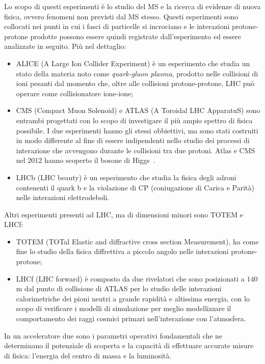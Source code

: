 Lo scopo di questi esperimenti è lo studio del MS e la ricerca di evidenze di nuova fisica, ovvero fenomeni non previsti dal MS stesso. Questi esperimenti sono collocati nei punti in cui i fasci di particelle si incrociano e le interazioni protone-protone prodotte possono essere quindi registrate dall'esperimento ed essere analizzate in seguito. Pi\`u nel dettaglio:
\begin{itemize}
\item ALICE (A Large Ion Collider Experiment) \`e un esperimento che studia un stato della materia noto come {\em quark-gluon plasma}, prodotto nelle collisioni di ioni pesanti dal momento che, oltre alle collisioni protone-protone, LHC pu\`o operare come collisionatore ione-ione;
\item CMS (Compact Muon Solenoid) e ATLAS (A Toroidal LHC ApparatuS) sono entrambi progettati con lo scopo di investigare il più ampio spettro di fisica possibile. I due esperimenti hanno gli stessi obbiettivi, ma sono stati costruiti in modo differente al fine di essere indipendenti nello studio dei processi di interazione che avvengono durante le collisioni tra due protoni. Atlas e CMS nel 2012 hanno scoperto il bosone di Higgs~\cite{scopertahiggs}. 
\item LHCb (LHC beauty) \`e un esperimento che studia la fisica degli adroni contenenti il quark b e la violazione di CP (coniugazione di Carica e Parità) nelle interazioni elettrodeboli.
\end{itemize}
Altri esperimenti presenti ad LHC, ma di dimensioni minori sono TOTEM e LHCf:
\begin{itemize}
\item TOTEM (TOTal Elastic and diffractive cross section Measurement), ha come fine lo studio della fisica diffrettiva a piccolo angolo nelle interazioni protone-protone;
\item LHCf (LHC forward) è composto da due rivelatori che sono posizionati a $140$m dal punto di collisione di ATLAS per lo studio delle interazioni calorimetriche dei pioni neutri a grande rapidità e altissima energia, con lo scopo di verificare i modelli di simulazione per meglio modellizzare il comportamento dei raggi cosmici primari nell'interazione con l'atmosfera.
\end{itemize}

In un acceleratore due sono i parametri operativi fondamentali che ne determinano il potenziale di scoperta e la capacit\`a di effettuare accurate misure di fisica: l'energia del centro di massa e la luminosit\`a.

